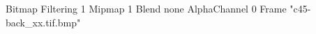 {Bitmap
	{Filtering 1}
	{Mipmap 1}
	{Blend none}
	{AlphaChannel 0}
	{Frame "c45-back_xx.tif.bmp"}
}
